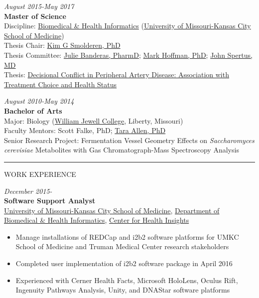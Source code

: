\documentclass[
]{article}
\begin{document}
\emph{August 2015-May 2017}\\
\textbf{Master of Science}\\
Discipline: \href{http://med.umkc.edu/dbhi/}{Biomedical \& Health
Informatics} (\href{http://med.umkc.edu}{University of Missouri-Kansas
City School of Medicine})\\
Thesis Chair:
\href{https://medicine.yale.edu/research-profile/kim_smolderen/}{Kim G
Smolderen, PhD}\\
Thesis Committee: \href{http://med.umkc.edu/dir/Banderas-Julie/}{Julie
Banderas, PharmD};
\href{https://researchers.childrensmercy.org/display/30252}{Mark
Hoffman, PhD}; \href{http://med.umkc.edu/dir/Spertus-John/}{John
Spertus, MD}\\
Thesis:
\href{https://mospace.umsystem.edu/xmlui/handle/10355/60583}{Decisional
Conflict in Peripheral Artery Disease: Association with Treatment Choice
and Health Status}

\emph{August 2010-May 2014}\\
\textbf{Bachelor of Arts}\\
Major: Biology (\href{https://jewell.edu}{William Jewell College},
Liberty, Missouri)\\
Faculty Mentors: Scott Falke, PhD;
\href{https://info.umkc.edu/sbc-directory/directory/tara-allen/}{Tara
Allen, PhD}\\
Senior Research Project: Fermentation Vessel Geometry Effects on
\emph{Saccharomyces cerevisiae} Metabolites with Gas Chromatograph-Mass
Spectroscopy Analysis

\begin{center}\rule{0.5\linewidth}{0.5pt}\end{center}

WORK EXPERIENCE

\emph{December 2015-}\\
\textbf{Software Support Analyst}\\
\href{http://med.umkc.edu}{University of Missouri-Kansas City School of
Medicine}, \href{http://med.umkc.edu/dbhi/}{Department of Biomedical \&
Health Informatics}, \href{https://chi.umkc.edu}{Center for Health
Insights}

\begin{itemize}
\item
  Manage installations of REDCap and i2b2 software platforms for UMKC
  School of Medicine and Truman Medical Center research stakeholders
\item
  Completed user implementation of i2b2 software package in April 2016
\item
  Experienced with Cerner Health Facts, Microsoft HoloLens, Oculus Rift,
  Ingenuity Pathways Analysis, Unity, and DNAStar software platforms
\end{itemize}
\end{document}
